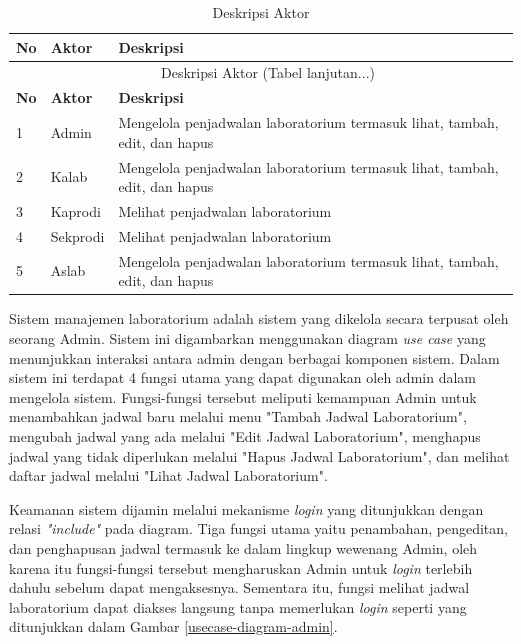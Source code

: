 	{
		\fontsize{10}{13}\selectfont
		\begin{longtable}{p{0.5cm} p{3cm} p{9.3cm}}
			\caption{Deskripsi Aktor}
			\label{tab:DeskripsiAktor}                                                                                    \\
			\hline
			\textbf{No} & \textbf{Aktor} & \textbf{Deskripsi}                                                             \\ \hline
			\endfirsthead

			\multicolumn{3}{c}{\normalsize\tablename\ \textbf{\thetable}\ {{Deskripsi Aktor \space (Tabel lanjutan...)}}} \\
			\hline
			\textbf{No} & \textbf{Aktor} & \textbf{Deskripsi}                                                             \\ \hline
			\endhead

			\hline
			\endfoot

			1           & Admin          & Mengelola penjadwalan laboratorium termasuk lihat, tambah, edit, dan hapus     \\
			2           & Kalab          & Mengelola penjadwalan laboratorium termasuk lihat, tambah, edit, dan hapus     \\
			3           & Kaprodi        & Melihat penjadwalan laboratorium                                               \\
			4           & Sekprodi       & Melihat penjadwalan laboratorium                                               \\
			5           & Aslab          & Mengelola penjadwalan laboratorium termasuk lihat, tambah, edit, dan hapus     \\ \hline
		\end{longtable}
	}

Sistem manajemen laboratorium adalah sistem yang dikelola secara terpusat oleh seorang Admin. Sistem ini digambarkan menggunakan diagram \textit{use case} yang menunjukkan interaksi antara admin dengan berbagai komponen sistem. Dalam sistem ini terdapat 4 fungsi utama yang dapat digunakan oleh admin dalam mengelola sistem. Fungsi-fungsi tersebut meliputi kemampuan Admin untuk menambahkan jadwal baru melalui menu "Tambah Jadwal Laboratorium", mengubah jadwal yang ada melalui "Edit Jadwal Laboratorium", menghapus jadwal yang tidak diperlukan melalui "Hapus Jadwal Laboratorium", dan melihat daftar jadwal melalui "Lihat Jadwal Laboratorium".

Keamanan sistem dijamin melalui mekanisme \textit{login} yang ditunjukkan dengan relasi \textit{"include"} pada diagram. Tiga fungsi utama yaitu penambahan, pengeditan, dan penghapusan jadwal termasuk ke dalam lingkup wewenang Admin, oleh karena itu fungsi-fungsi tersebut mengharuskan Admin untuk \textit{login} terlebih dahulu sebelum dapat mengaksesnya. Sementara itu, fungsi melihat jadwal laboratorium dapat diakses langsung tanpa memerlukan \textit{login} seperti yang ditunjukkan dalam Gambar \ref{usecase-diagram-admin}.

